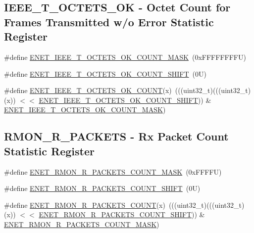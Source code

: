 \subsection*{I\+E\+E\+E\+\_\+\+T\+\_\+\+O\+C\+T\+E\+T\+S\+\_\+\+OK -\/ Octet Count for Frames Transmitted w/o Error Statistic Register}
\begin{DoxyCompactItemize}
\item 
\#define \mbox{\hyperlink{group___e_n_e_t___register___masks_ga6f934fd96f95ccb0d4faa6c215f86cf7}{E\+N\+E\+T\+\_\+\+I\+E\+E\+E\+\_\+\+T\+\_\+\+O\+C\+T\+E\+T\+S\+\_\+\+O\+K\+\_\+\+C\+O\+U\+N\+T\+\_\+\+M\+A\+SK}}~(0x\+F\+F\+F\+F\+F\+F\+F\+F\+U)
\item 
\#define \mbox{\hyperlink{group___e_n_e_t___register___masks_ga56ee9e359f04a1e6250f1fb5bf0ce288}{E\+N\+E\+T\+\_\+\+I\+E\+E\+E\+\_\+\+T\+\_\+\+O\+C\+T\+E\+T\+S\+\_\+\+O\+K\+\_\+\+C\+O\+U\+N\+T\+\_\+\+S\+H\+I\+FT}}~(0\+U)
\item 
\#define \mbox{\hyperlink{group___e_n_e_t___register___masks_ga69bb269ecd63f2cf3d274f4e3bcccb9f}{E\+N\+E\+T\+\_\+\+I\+E\+E\+E\+\_\+\+T\+\_\+\+O\+C\+T\+E\+T\+S\+\_\+\+O\+K\+\_\+\+C\+O\+U\+NT}}(x)~(((uint32\+\_\+t)(((uint32\+\_\+t)(x)) $<$$<$ \mbox{\hyperlink{group___e_n_e_t___register___masks_ga56ee9e359f04a1e6250f1fb5bf0ce288}{E\+N\+E\+T\+\_\+\+I\+E\+E\+E\+\_\+\+T\+\_\+\+O\+C\+T\+E\+T\+S\+\_\+\+O\+K\+\_\+\+C\+O\+U\+N\+T\+\_\+\+S\+H\+I\+FT}})) \& \mbox{\hyperlink{group___e_n_e_t___register___masks_ga6f934fd96f95ccb0d4faa6c215f86cf7}{E\+N\+E\+T\+\_\+\+I\+E\+E\+E\+\_\+\+T\+\_\+\+O\+C\+T\+E\+T\+S\+\_\+\+O\+K\+\_\+\+C\+O\+U\+N\+T\+\_\+\+M\+A\+SK}})
\end{DoxyCompactItemize}
\subsection*{R\+M\+O\+N\+\_\+\+R\+\_\+\+P\+A\+C\+K\+E\+TS -\/ Rx Packet Count Statistic Register}
\begin{DoxyCompactItemize}
\item 
\#define \mbox{\hyperlink{group___e_n_e_t___register___masks_gaffeecf969d5f86c7d84c936ea078e859}{E\+N\+E\+T\+\_\+\+R\+M\+O\+N\+\_\+\+R\+\_\+\+P\+A\+C\+K\+E\+T\+S\+\_\+\+C\+O\+U\+N\+T\+\_\+\+M\+A\+SK}}~(0x\+F\+F\+F\+F\+U)
\item 
\#define \mbox{\hyperlink{group___e_n_e_t___register___masks_gaf03a05af7b6a3435e843eef9f55d8bba}{E\+N\+E\+T\+\_\+\+R\+M\+O\+N\+\_\+\+R\+\_\+\+P\+A\+C\+K\+E\+T\+S\+\_\+\+C\+O\+U\+N\+T\+\_\+\+S\+H\+I\+FT}}~(0\+U)
\item 
\#define \mbox{\hyperlink{group___e_n_e_t___register___masks_ga6564e8eb4dfe2940b5233b17edea14a4}{E\+N\+E\+T\+\_\+\+R\+M\+O\+N\+\_\+\+R\+\_\+\+P\+A\+C\+K\+E\+T\+S\+\_\+\+C\+O\+U\+NT}}(x)~(((uint32\+\_\+t)(((uint32\+\_\+t)(x)) $<$$<$ \mbox{\hyperlink{group___e_n_e_t___register___masks_gaf03a05af7b6a3435e843eef9f55d8bba}{E\+N\+E\+T\+\_\+\+R\+M\+O\+N\+\_\+\+R\+\_\+\+P\+A\+C\+K\+E\+T\+S\+\_\+\+C\+O\+U\+N\+T\+\_\+\+S\+H\+I\+FT}})) \& \mbox{\hyperlink{group___e_n_e_t___register___masks_gaffeecf969d5f86c7d84c936ea078e859}{E\+N\+E\+T\+\_\+\+R\+M\+O\+N\+\_\+\+R\+\_\+\+P\+A\+C\+K\+E\+T\+S\+\_\+\+C\+O\+U\+N\+T\+\_\+\+M\+A\+SK}})
\end{DoxyCompactItemize}
